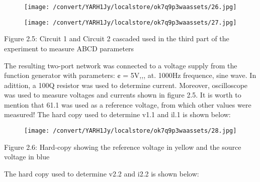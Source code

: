 \documentclass[12pt]{report}
\begin{document}
\vspace{10pt}

\begin{figure}[h]

\texttt{[image: /convert/YARH1Jy/localstore/ok7q9p3waassets/26.jpg]}

\centering

\end{figure}

\par

\vspace{10pt}

\begin{figure}[h]

\texttt{[image: /convert/YARH1Jy/localstore/ok7q9p3waassets/27.jpg]}

\centering

\end{figure}

    Figure 2.5: Circuit 1 and Circuit 2 cascaded used in the third part of the  experiment to measure ABCD parameters 

\vspace{10pt}

    The resulting two-port network was connected to a voltage supply from  the function generator with parameters: ¢ = 5V,,, at. 1000Hz frequence, sine  wave. In adittion, a 100Q resistor was used to determine current. Moreover,  oscilloscope was used to measure voltages and currents shown in figure 2.5.  It is worth to mention that 61.1 was used as a reference voltage, from which  other values were measured! The hard copy used to determine v1.1 and il.1  is shown below: 

\vspace{10pt}

\begin{figure}[h]

\texttt{[image: /convert/YARH1Jy/localstore/ok7q9p3waassets/28.jpg]}

\centering

\end{figure}

    Figure 2.6: Hard-copy showing the reference voltage in yellow and the source  voltage in blue 

\vspace{10pt}

    The hard copy used to determine v2.2 and i2.2 is shown below: 
\end{document}
